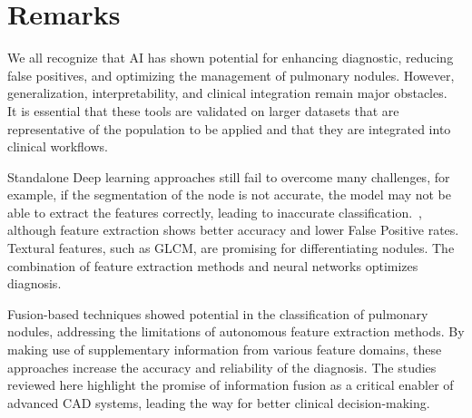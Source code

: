 



\section{Remarks}
We all recognize that AI has shown potential for enhancing diagnostic, reducing false positives, and optimizing the management of pulmonary nodules. However, generalization, interpretability, and clinical integration remain major obstacles.~\cite{ArtificialIntelligence2022} It is essential that these tools are validated on larger datasets that are representative of the population to be applied and that they are integrated into clinical workflows.~\cite{Wu2024}

Standalone Deep learning approaches still fail to overcome many challenges, for example, if the segmentation of the node is not accurate, the model may not be able to extract the features correctly, leading to inaccurate classification.~\cite{Gu2021, Shaffie2021}, although feature extraction shows better accuracy and lower False Positive rates. Textural features, such as GLCM, are promising for differentiating nodules. The combination of feature extraction methods and neural networks optimizes diagnosis.~\cite{Mathumetha2024}

Fusion-based techniques showed potential in the classification of pulmonary nodules, addressing the limitations of autonomous feature extraction methods. By making use of supplementary information from various feature domains, these approaches increase the accuracy and reliability of the diagnosis. The studies reviewed here highlight the promise of information fusion as a critical enabler of advanced CAD systems, leading the way for better clinical decision-making.